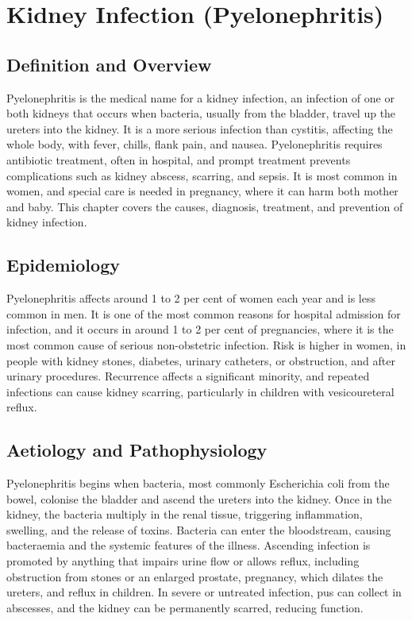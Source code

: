 \chapter{Kidney Infection (Pyelonephritis)}

\section*{Definition and Overview}
Pyelonephritis is the medical name for a kidney infection, an infection of one or both kidneys that occurs when bacteria, usually from the bladder, travel up the ureters into the kidney. It is a more serious infection than cystitis, affecting the whole body, with fever, chills, flank pain, and nausea. Pyelonephritis requires antibiotic treatment, often in hospital, and prompt treatment prevents complications such as kidney abscess, scarring, and sepsis. It is most common in women, and special care is needed in pregnancy, where it can harm both mother and baby. This chapter covers the causes, diagnosis, treatment, and prevention of kidney infection.

\section*{Epidemiology}
Pyelonephritis affects around 1 to 2 per cent of women each year and is less common in men. It is one of the most common reasons for hospital admission for infection, and it occurs in around 1 to 2 per cent of pregnancies, where it is the most common cause of serious non-obstetric infection. Risk is higher in women, in people with kidney stones, diabetes, urinary catheters, or obstruction, and after urinary procedures. Recurrence affects a significant minority, and repeated infections can cause kidney scarring, particularly in children with vesicoureteral reflux.

\section*{Aetiology and Pathophysiology}
Pyelonephritis begins when bacteria, most commonly Escherichia coli from the bowel, colonise the bladder and ascend the ureters into the kidney. Once in the kidney, the bacteria multiply in the renal tissue, triggering inflammation, swelling, and the release of toxins. Bacteria can enter the bloodstream, causing bacteraemia and the systemic features of the illness. Ascending infection is promoted by anything that impairs urine flow or allows reflux, including obstruction from stones or an enlarged prostate, pregnancy, which dilates the ureters, and reflux in children. In severe or untreated infection, pus can collect in abscesses, and the kidney can be permanently scarred, reducing function.

